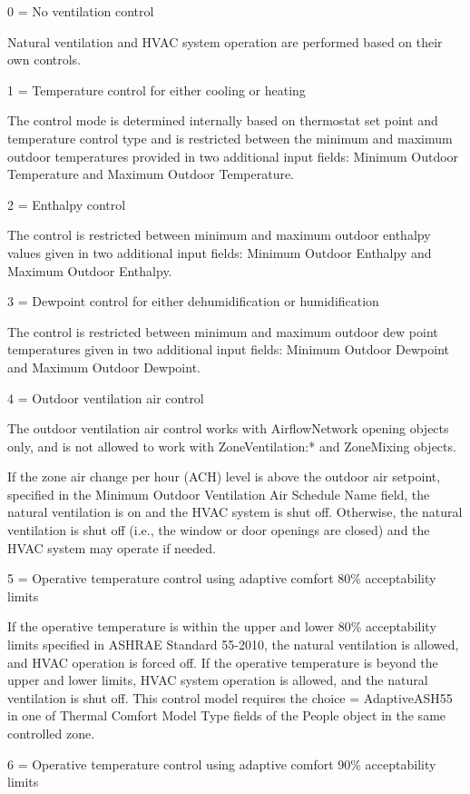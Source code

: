 \begin{description}
  \item
  0 = No ventilation control
  
  Natural ventilation and HVAC system operation are performed based on their own controls.
  \item
  1 = Temperature control for either cooling or heating
  
  The control mode is determined internally based on thermostat set point and temperature control type and is restricted between the minimum and maximum outdoor temperatures provided in two additional input fields: Minimum Outdoor Temperature and Maximum Outdoor Temperature.
  \item
  2 = Enthalpy control
  
  The control is restricted between minimum and maximum outdoor enthalpy values given in two additional input fields: Minimum Outdoor Enthalpy and Maximum Outdoor Enthalpy.
  \item
  3 = Dewpoint control for either dehumidification or humidification

  The control is restricted between minimum and maximum outdoor dew point temperatures given in two additional input fields: Minimum Outdoor Dewpoint and Maximum Outdoor Dewpoint.
  \item
  4 = Outdoor ventilation air control
  
  The outdoor ventilation air control works with AirflowNetwork opening objects only, and is not allowed to work with ZoneVentilation:* and ZoneMixing objects.
  
  If the zone air change per hour (ACH) level is above the outdoor air setpoint, specified in the Minimum Outdoor Ventilation Air Schedule Name field, the natural ventilation is on and the HVAC system is shut off. Otherwise, the natural ventilation is shut off (i.e., the window or door openings are closed) and the HVAC system may operate if needed.
  \item
  5 = Operative temperature control using adaptive comfort 80\% acceptability limits
  
  If the operative temperature is within the upper and lower 80\% acceptability limits specified in ASHRAE Standard 55-2010, the natural ventilation is allowed, and HVAC operation is forced off. If the operative temperature is beyond the upper and lower limits, HVAC system operation is allowed, and the natural ventilation is shut off.
  This control model requires the choice = AdaptiveASH55 in one of Thermal Comfort Model Type fields of the People object in the same controlled zone.
  \item
  6 = Operative temperature control using adaptive comfort 90\% acceptability limits
  

\end{description}
